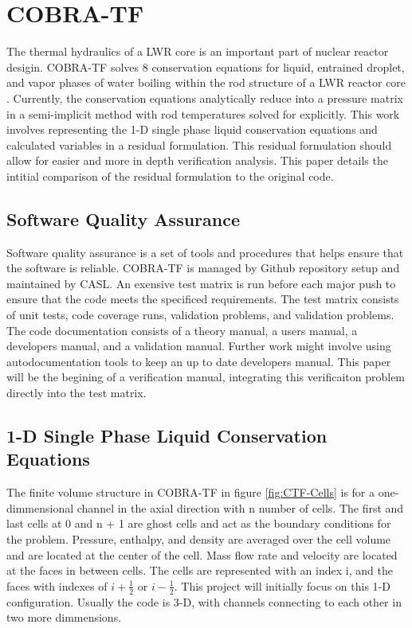 \documentclass{mc2015}
\begin{document}
\section{COBRA-TF}

The thermal hydraulics of a LWR core is an important part of nuclear
reactor desigin. COBRA-TF solves 8 conservation equations for liquid,
entrained droplet, and vapor phases of water boiling within the rod structure
of a LWR reactor core \cite{CTF_Theory}. Currently, the conservation
equations analytically reduce into a pressure matrix in a semi-implicit
method with rod temperatures solved for explicitly. This work involves
representing the 1-D single phase liquid conservation equations and calculated 
variables in a residual formulation. This residual formulation should allow for
easier and more in depth verification analysis. This paper details the intitial
comparison of the residual formulation to the original code.

\subsection{Software Quality Assurance}

Software quality assurance is a set of tools and procedures that helps
ensure that the software is reliable. COBRA-TF is managed by Github repository
setup and maintained by CASL. An exensive test matrix is run before each major
push to ensure that the code meets the specificed requirements. The test matrix
consists of unit tests, code coverage runs, validation problems, and validation
problems. The code documentation consists of a theory manual, a users manual, a
developers manual, and a validation manual. Further work might involve using
autodocumentation tools to keep an up to date developers manual. This paper will
be the begining of a verification manual, integrating this verificaiton problem
directly into the test matrix.

\subsection{1-D Single Phase Liquid Conservation Equations}

The finite volume structure in COBRA-TF in figure \ref{fig:CTF-Cells} is for a
one-dimmensional channel in the axial direction with n number of cells. The
first and last cells at 0 and n + 1 are ghost cells and act as the boundary
conditions for the problem. Pressure, enthalpy, and density are averaged over
the cell volume and are located at the center of the cell. Mass flow rate and
velocity are located at the faces in between cells. The cells  are represented
with an index i, and the faces with indexes of $i + \frac{1}{2}$ or 
$i-\frac{1}{2}$. This project will initially focus on this 1-D configuration.
Usually the code  is 3-D,  with channels connecting to each other in two more 
dimmensions.
\end{document}
